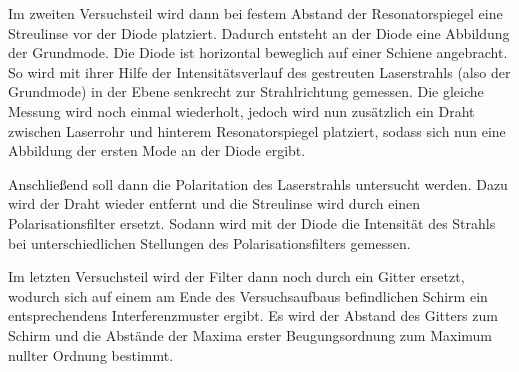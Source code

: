 Im zweiten Versuchsteil wird dann bei festem Abstand der Resonatorspiegel eine
Streulinse vor der Diode platziert. Dadurch entsteht an der Diode eine Abbildung
der Grundmode. Die Diode ist horizontal beweglich auf einer
Schiene angebracht. So wird mit ihrer Hilfe der Intensitätsverlauf des gestreuten
Laserstrahls (also der Grundmode) in der Ebene senkrecht zur Strahlrichtung gemessen.
Die gleiche Messung wird noch einmal wiederholt, jedoch wird nun zusätzlich ein
Draht zwischen Laserrohr und hinterem Resonatorspiegel platziert, sodass sich nun
eine Abbildung der ersten Mode an der Diode ergibt.

Anschließend soll dann die Polaritation des Laserstrahls untersucht werden. Dazu
wird der Draht wieder entfernt und die Streulinse wird durch einen Polarisationsfilter
ersetzt. Sodann wird mit der Diode die Intensität des Strahls bei unterschiedlichen
Stellungen des Polarisationsfilters gemessen.

Im letzten Versuchsteil wird der Filter dann noch durch ein Gitter ersetzt, wodurch
sich auf einem am Ende des Versuchsaufbaus befindlichen Schirm ein entsprechendens
Interferenzmuster ergibt. Es wird der Abstand des Gitters zum Schirm und die Abstände
der Maxima erster Beugungsordnung zum Maximum nullter Ordnung bestimmt.
